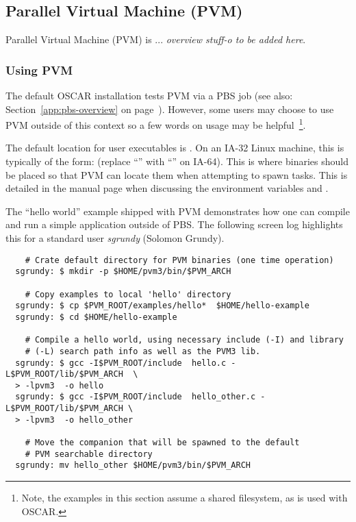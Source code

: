 %
%
%

\subsection{Parallel Virtual Machine (PVM)}
\label{app:pvm-overview}

Parallel Virtual Machine (PVM) is ... \emph{overview stuff-o to be
added here}.


\subsubsection{Using PVM}
\label{app:pvm-usage}

The default OSCAR installation tests PVM via a PBS job (see also:
Section~\ref{app:pbs-overview} on page~\pageref{app:pbs-overview}).
However, some users may choose to use PVM outside of this context so a
few words on usage may be helpful~\footnote{Note, the examples in this
  section assume a shared filesystem, as is used with OSCAR.}.

The default location for user executables is
.  On an IA-32 Linux machine, this
is typically of the form:  (replace
``'' with ``'' on IA-64).  This is where
binaries should be placed so that PVM can locate them when attempting
to spawn tasks.  This is detailed in the 
manual page when discussing the environment variables 
and .

The ``hello world'' example shipped with PVM demonstrates how one can
compile and run a simple application outside of PBS.  The following
screen log highlights this for a standard user \emph{sgrundy} (Solomon
Grundy).

\begin{small}
\begin{verbatim}
    # Crate default directory for PVM binaries (one time operation)
  sgrundy: $ mkdir -p $HOME/pvm3/bin/$PVM_ARCH

    # Copy examples to local 'hello' directory
  sgrundy: $ cp $PVM_ROOT/examples/hello*  $HOME/hello-example
  sgrundy: $ cd $HOME/hello-example

    # Compile a hello world, using necessary include (-I) and library
    # (-L) search path info as well as the PVM3 lib.
  sgrundy: $ gcc -I$PVM_ROOT/include  hello.c -L$PVM_ROOT/lib/$PVM_ARCH  \
  > -lpvm3  -o hello
  sgrundy: $ gcc -I$PVM_ROOT/include  hello_other.c -L$PVM_ROOT/lib/$PVM_ARCH \
  > -lpvm3  -o hello_other

    # Move the companion that will be spawned to the default 
    # PVM searchable directory
  sgrundy: mv hello_other $HOME/pvm3/bin/$PVM_ARCH
\end{verbatim}
\end{small}

